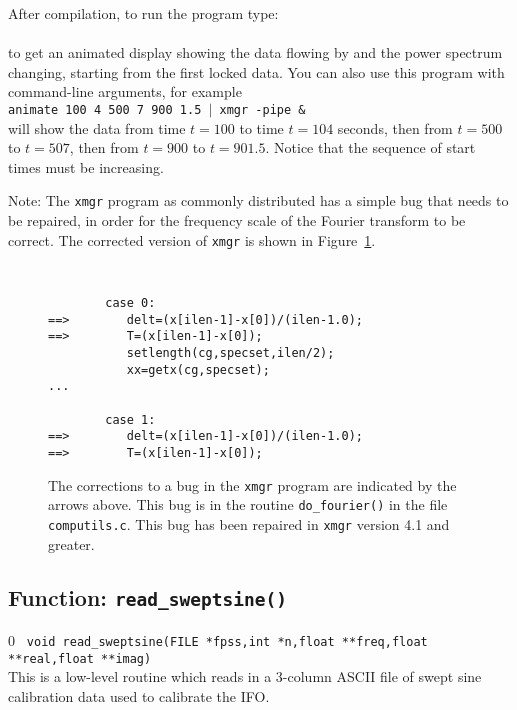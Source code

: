 After compilation, to run the program type:\\
 \\
to get an animated display showing the data flowing by and the power
spectrum changing, starting from the first locked data.  You can also
use this program with command-line arguments, for example\\ \indent
{\tt  animate 100 4 500 7 900 1.5 $|$ xmgr -pipe \&}\\ will show the
data from time $t= 100$ to time $t=104 $ seconds, then from $t=500$ to
$t=507$, then from $t=900$ to $t=901.5$.  Notice that the sequence of
start times must be increasing.

Note:  The {\tt xmgr} program as commonly distributed has a simple
bug that needs to be repaired, in order for the frequency scale of the
Fourier transform to be correct.  The corrected version of {\tt xmgr}
is shown in Figure~\ref{f:xmgrbug}.
\begin{figure}
\hrulefill
{\tt
\begin{verbatim}
        case 0:
==>        delt=(x[ilen-1]-x[0])/(ilen-1.0);
==>        T=(x[ilen-1]-x[0]);
           setlength(cg,specset,ilen/2);
           xx=getx(cg,specset);
...

        case 1:
==>        delt=(x[ilen-1]-x[0])/(ilen-1.0);
==>        T=(x[ilen-1]-x[0]);
\end{verbatim}}
\caption{\label{f:xmgrbug} The corrections to a bug in the {\tt xmgr}
program are indicated by the arrows above.  This bug is in the routine
{\tt do\_fourier()} in the file {\tt computils.c}. This bug has been repaired
in {\tt xmgr} version 4.1 and greater.}
\hrulefill
\end{figure}

\clearpage

\subsection{Function: {\tt read\_sweptsine()}}
\setcounter{equation}0
{\tt 
void read\_sweptsine(FILE *fpss,int *n,float **freq,float **real,float **imag)}\\
This is a low-level routine which reads in a 3-column ASCII file of
swept sine calibration data used to calibrate the IFO.

